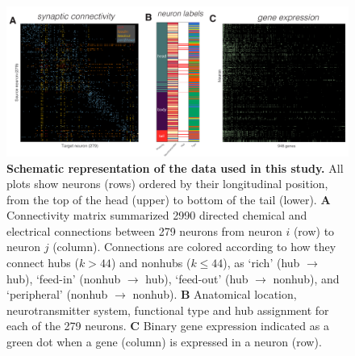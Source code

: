 \documentclass[10pt,letterpaper]{article}
\begin{document}
\begin{figure}[h]
  \centering
    \includegraphics[width=1\textwidth]{SchematicIndicators.pdf}
 \caption{\textbf{Schematic representation of the data used in this study.}
All plots show neurons (rows) ordered by their longitudinal position, from the top of the head (upper) to bottom of the tail (lower).
 \textbf{A} Connectivity matrix summarized 2990 directed chemical and electrical connections between 279 neurons from neuron $i$ (row) to neuron $j$ (column).
Connections are colored according to how they connect hubs ($k > 44$) and nonhubs ($k \leq 44$), as `rich' (hub $\rightarrow$ hub), `feed-in' (nonhub $\rightarrow$ hub), `feed-out' (hub $\rightarrow$ nonhub), and `peripheral' (nonhub $\rightarrow$ nonhub).
  \textbf{B} Anatomical location, neurotransmitter system, functional type and hub assignment for each of the 279 neurons.
 \textbf{C} Binary gene expression indicated as a green dot when a gene (column) is expressed in a neuron (row).
}
\label{fig:SchematicRepresentation}
\end{figure}
\end{document}
